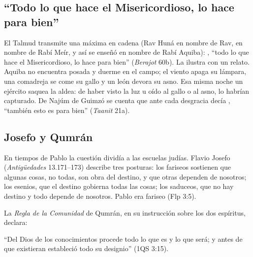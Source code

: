 \subsection{“Todo lo que hace el Misericordioso, lo hace para bien”}
El Talmud transmite una máxima en cadena (Rav Huná en nombre de Rav, en nombre de Rabí Meír, y así se enseñó en nombre de Rabí Aquiba): , ``todo lo que hace el Misericordioso, lo hace para bien'' (\emph{Berajot} 60b). La ilustra con un relato. Aquiba no encuentra posada y duerme en el campo; el viento apaga su lámpara, una comadreja se come su gallo y un león devora su asno. Esa misma noche un ejército saquea la aldea: de haber visto la luz u oído al gallo o al asno, lo habrían capturado. De Najúm de Guimzó se cuenta que ante cada desgracia decía , ``también esto es para bien'' (\emph{Taanit} 21a).


\subsection{Josefo y Qumrán}
En tiempos de Pablo la cuestión dividía a las escuelas judías. Flavio Josefo (\emph{Antigüedades} 13.171--173) describe tres posturas: los fariseos sostienen que algunas cosas, no todas, son obra del destino, y que otras dependen de nosotros; los esenios, que el destino gobierna todas las cosas; los saduceos, que no hay destino y todo depende de nosotros. Pablo era fariseo (Flp 3:5).

La \emph{Regla de la Comunidad} de Qumrán, en su instrucción sobre los dos espíritus, declara:


``Del Dios de los conocimientos procede todo lo que es y lo que será; y antes de que existieran estableció todo su designio'' (1QS 3:15).


